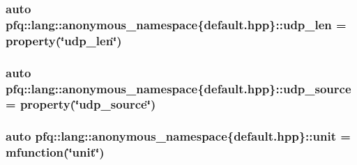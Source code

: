 \hypertarget{namespacepfq_1_1lang_1_1anonymous__namespace_02default_8hpp_03_ac7f1ef80a8ec46ce01aa12f66cfee86b}{
\subsubsection[{udp\+\_\+len}]{\setlength{\rightskip}{0pt plus 5cm}auto pfq\+::lang\+::anonymous\+\_\+namespace\{default.\+hpp\}\+::udp\+\_\+len = {\bf property}(\char`\"{}udp\+\_\+len\char`\"{})}}\label{namespacepfq_1_1lang_1_1anonymous__namespace_02default_8hpp_03_ac7f1ef80a8ec46ce01aa12f66cfee86b}
\hypertarget{namespacepfq_1_1lang_1_1anonymous__namespace_02default_8hpp_03_ab44590359ef60febe9bfc6465bcf932a}{
\subsubsection[{udp\+\_\+source}]{\setlength{\rightskip}{0pt plus 5cm}auto pfq\+::lang\+::anonymous\+\_\+namespace\{default.\+hpp\}\+::udp\+\_\+source = {\bf property}(\char`\"{}udp\+\_\+source\char`\"{})}}\label{namespacepfq_1_1lang_1_1anonymous__namespace_02default_8hpp_03_ab44590359ef60febe9bfc6465bcf932a}
\hypertarget{namespacepfq_1_1lang_1_1anonymous__namespace_02default_8hpp_03_a85f9b2d401cbb1d135679160de0e97de}{
\subsubsection[{unit}]{\setlength{\rightskip}{0pt plus 5cm}auto pfq\+::lang\+::anonymous\+\_\+namespace\{default.\+hpp\}\+::unit = {\bf mfunction}(\char`\"{}unit\char`\"{})}}\label{namespacepfq_1_1lang_1_1anonymous__namespace_02default_8hpp_03_a85f9b2d401cbb1d135679160de0e97de}
